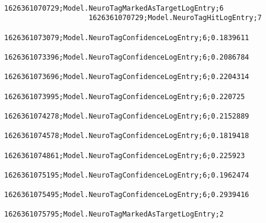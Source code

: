 \begin{lstlisting}
                    1626361070729;Model.NeuroTagMarkedAsTargetLogEntry;6
                    1626361070729;Model.NeuroTagHitLogEntry;7
                    1626361073079;Model.NeuroTagConfidenceLogEntry;6;0.1839611
                    1626361073396;Model.NeuroTagConfidenceLogEntry;6;0.2086784
                    1626361073696;Model.NeuroTagConfidenceLogEntry;6;0.2204314
                    1626361073995;Model.NeuroTagConfidenceLogEntry;6;0.220725
                    1626361074278;Model.NeuroTagConfidenceLogEntry;6;0.2152889
                    1626361074578;Model.NeuroTagConfidenceLogEntry;6;0.1819418
                    1626361074861;Model.NeuroTagConfidenceLogEntry;6;0.225923
                    1626361075195;Model.NeuroTagConfidenceLogEntry;6;0.1962474
                    1626361075495;Model.NeuroTagConfidenceLogEntry;6;0.2939416
                    1626361075795;Model.NeuroTagMarkedAsTargetLogEntry;2
                \end{lstlisting}
            

        \listoffigures %
        \listoftables %


     
    

    \clearpage\thispagestyle{empty}
    \eigen  %

